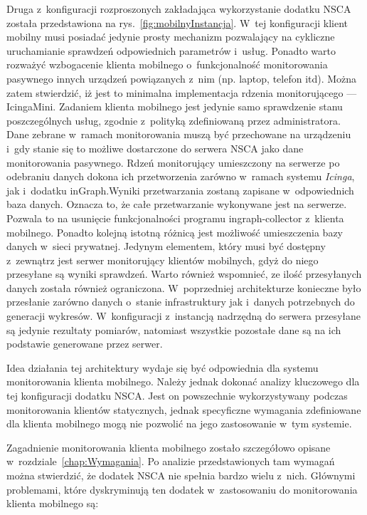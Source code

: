 Druga z~konfiguracji rozproszonych zakładająca wykorzystanie dodatku
NSCA została przedstawiona na rys.~\ref{fig:mobilnyInstancja}. W~tej
konfiguracji klient mobilny musi posiadać jedynie prosty mechanizm
pozwalający na cykliczne uruchamianie sprawdzeń odpowiednich
parametrów i~usług. Ponadto warto rozważyć wzbogacenie klienta
mobilnego o~funkcjonalność monitorowania pasywnego innych urządzeń
powiązanych z~nim (np. laptop, telefon itd). Można zatem stwierdzić,
iż jest to minimalna implementacja rdzenia monitorującego ---
IcingaMini. Zadaniem klienta mobilnego jest jedynie samo sprawdzenie
stanu poszczególnych usług, zgodnie z~polityką zdefiniowaną przez
administratora. Dane zebrane w~ramach monitorowania muszą być
przechowane na urządzeniu i~gdy stanie się to możliwe dostarczone do
serwera NSCA jako dane monitorowania pasywnego. Rdzeń monitorujący
umieszczony na serwerze po odebraniu danych dokona ich przetworzenia
zarówno w~ramach systemu {\em Icinga}, jak i~dodatku inGraph.Wyniki
przetwarzania zostaną zapisane w~odpowiednich baza danych. Oznacza to,
że całe przetwarzanie wykonywane jest na serwerze. Pozwala to na
usunięcie funkcjonalności programu ingraph-collector z~klienta
mobilnego. Ponadto kolejną istotną różnicą jest możliwość umieszczenia
bazy danych w~sieci prywatnej. Jedynym elementem, który musi być
dostępny z~zewnątrz jest serwer monitorujący klientów mobilnych, gdyż
do niego przesyłane są wyniki sprawdzeń. Warto również wspomnieć, ze
ilość przesyłanych danych została również ograniczona. W~poprzedniej
architekturze konieczne było przesłanie zarówno danych o~stanie
infrastruktury jak i~danych potrzebnych do generacji
wykresów. W~konfiguracji z~instancją nadrzędną do serwera przesyłane
są jedynie rezultaty pomiarów, natomiast wszystkie pozostałe dane są
na ich podstawie generowane przez serwer.

Idea działania tej architektury wydaje się być odpowiednia dla systemu
monitorowania klienta mobilnego. Należy jednak dokonać analizy
kluczowego dla tej konfiguracji dodatku NSCA. Jest on powszechnie
wykorzystywany podczas monitorowania klientów statycznych, jednak
specyficzne wymagania zdefiniowane dla klienta mobilnego mogą nie
pozwolić na jego zastosowanie w~tym systemie.

Zagadnienie monitorowania klienta mobilnego zostało szczegółowo
opisane w~rozdziale~\ref{chap:Wymagania}. Po analizie przedstawionych
tam wymagań można stwierdzić, że dodatek NSCA nie spełnia bardzo wielu
z~nich. Głównymi problemami, które dyskryminują ten dodatek
w~zastosowaniu do monitorowania klienta mobilnego są:

